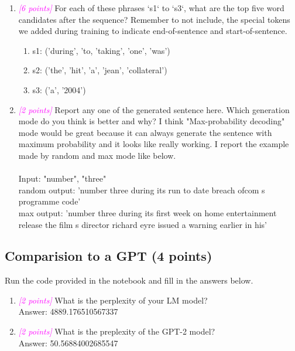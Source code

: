 \documentclass{exam}
\newcommand{\grade}[1]{\small\textcolor{magenta}{\emph{[#1 points]}} \normalsize}
\begin{document}
\begin{enumerate}
    \item \grade{6} For each of these phrases `s1` to `s3`, what are the top five word candidates after the sequence? Remember to not include, the special tokens we added during training to indicate end-of-sentence and start-of-sentence.
    \begin{enumerate}
        \item s1:  ('during', 'to, 'taking', 'one', 'was') %
        \item s2: ('the', 'hit', 'a', 'jean', 'collateral') %
        \item s3: ('a', '2004') %
        
    \end{enumerate}
    
    \item \grade{2} Report any one of the generated sentence here. Which generation mode do you think is better and why?
    I think "Max-probability decoding" mode would be great because it can always generate the sentence with maximum probability and it looks like really working.
    I report the example made by random and max mode like below.
    \\
    \\ Input: "number", "three"
    \\ random output: 'number three during its run to date breach ofcom s programme code'
    \\ max output:  'number three during its first week on home entertainment release the film s director richard eyre issued a warning earlier in his'
    \vspace{3cm}
    
     
\end{enumerate}
\subsection{Comparision to a GPT (4 points)}
Run the code provided in the notebook and fill in the answers below.

\begin{enumerate}
    \item \grade{2} What is the perplexity of your LM model?
    \\ Answer: 4889.176510567337  %
    
    \vspace{5cm}
    \item \grade{2} What is the preplexity of the GPT-2 model?
    \\ Answer: 50.56884002685547
    
\end{enumerate}
\end{document}
